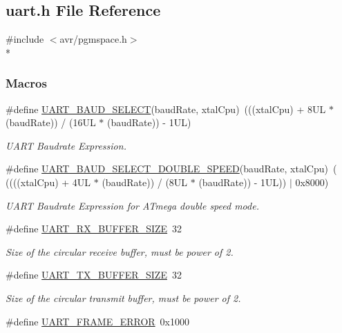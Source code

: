 \hypertarget{a00005}{}\subsection{uart.\+h File Reference}
\label{a00005}
{\ttfamily \#include $<$avr/pgmspace.\+h$>$}\\*
\subsubsection*{Macros}
\begin{DoxyCompactItemize}
\item 
\#define \hyperlink{a00008_ga367ff7b5de225ed936a63239ad4adb0b}{U\+A\+R\+T\+\_\+\+B\+A\+U\+D\+\_\+\+S\+E\+L\+E\+CT}(baud\+Rate,  xtal\+Cpu)~(((xtal\+Cpu) + 8\+U\+L $\ast$ (baud\+Rate)) / (16\+U\+L $\ast$ (baud\+Rate)) -\/ 1\+U\+L)
\begin{DoxyCompactList}\small\item\em U\+A\+RT Baudrate Expression. \end{DoxyCompactList}\item 
\#define \hyperlink{a00008_ga1a02d45130520cb651ab313e69039382}{U\+A\+R\+T\+\_\+\+B\+A\+U\+D\+\_\+\+S\+E\+L\+E\+C\+T\+\_\+\+D\+O\+U\+B\+L\+E\+\_\+\+S\+P\+E\+ED}(baud\+Rate,  xtal\+Cpu)~( ((((xtal\+Cpu) + 4\+U\+L $\ast$ (baud\+Rate)) / (8\+U\+L $\ast$ (baud\+Rate)) -\/ 1\+U\+L)) $\vert$ 0x8000)
\begin{DoxyCompactList}\small\item\em U\+A\+RT Baudrate Expression for A\+Tmega double speed mode. \end{DoxyCompactList}\item 
\#define \hyperlink{a00008_ga5bdd6772c246436bb14377095de79b31}{U\+A\+R\+T\+\_\+\+R\+X\+\_\+\+B\+U\+F\+F\+E\+R\+\_\+\+S\+I\+ZE}~32
\begin{DoxyCompactList}\small\item\em Size of the circular receive buffer, must be power of 2. \end{DoxyCompactList}\item 
\#define \hyperlink{a00008_ga05f5d709605c6317c97e4974bec3402a}{U\+A\+R\+T\+\_\+\+T\+X\+\_\+\+B\+U\+F\+F\+E\+R\+\_\+\+S\+I\+ZE}~32
\begin{DoxyCompactList}\small\item\em Size of the circular transmit buffer, must be power of 2. \end{DoxyCompactList}\item 
\#define \hyperlink{a00008_gabcdb1041d763560cd8f8e722370dfd37}{U\+A\+R\+T\+\_\+\+F\+R\+A\+M\+E\+\_\+\+E\+R\+R\+OR}~0x1000

\end{DoxyCompactItemize}
